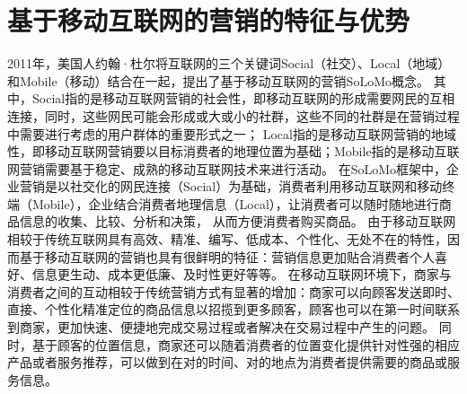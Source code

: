 \documentclass[a4paper]{article}
\begin{document}
\section{基于移动互联网的营销的特征与优势}
	2011年，美国人约翰·杜尔将互联网的三个关键词Social（社交）、Local（地域）和Mobile（移动）结合在一起，提出了基于移动互联网的营销SoLoMo概念。
	其中，Social指的是移动互联网营销的社会性，即移动互联网的形成需要网民的互相连接，同时，这些网民可能会形成或大或小的社群，这些不同的社群是在营销过程中需要进行考虑的用户群体的重要形式之一；
	Local指的是移动互联网营销的地域性，即移动互联网营销要以目标消费者的地理位置为基础；Mobile指的是移动互联网营销需要基于稳定、成熟的移动互联网技术来进行活动。
	在SoLoMo框架中，企业营销是以社交化的网民连接（Social）为基础，消费者利用移动互联网和移动终端（Mobile），企业结合消费者地理信息（Local），让消费者可以随时随地进行商品信息的收集、比较、分析和决策，
	从而方便消费者购买商品。\cite{1}
	由于移动互联网相较于传统互联网具有高效、精准、编写、低成本、个性化、无处不在的特性，因而基于移动互联网的营销也具有很鲜明的特征：营销信息更加贴合消费者个人喜好、信息更生动、成本更低廉、及时性更好等等。
	在移动互联网环境下，商家与消费者之间的互动相较于传统营销方式有显著的增加：商家可以向顾客发送即时、直接、个性化精准定位的商品信息以招揽到更多顾客，顾客也可以在第一时间联系到商家，更加快速、便捷地完成交易过程或者解决在交易过程中产生的问题。
	同时，基于顾客的位置信息，商家还可以随着消费者的位置变化提供针对性强的相应产品或者服务推荐，可以做到在对的时间、对的地点为消费者提供需要的商品或服务信息。
\end{document}
